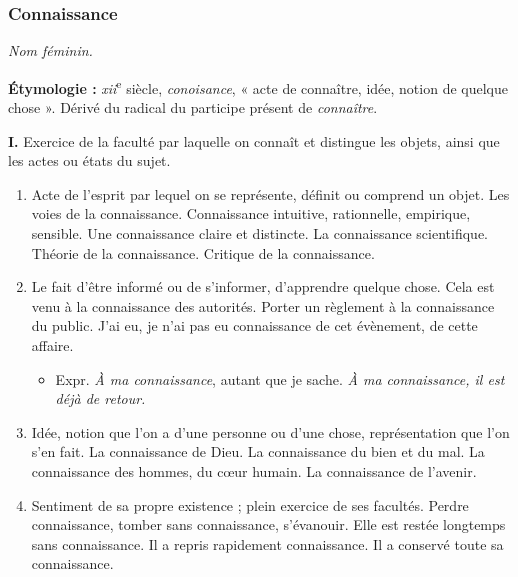 \begin{graybox}
    \subsubsection{Connaissance}

    \textit{Nom féminin.} \parencite{acfr_connaissance}

    \textbf{Étymologie :} \textit{xii}\textsuperscript{e} siècle,
    \textit{conoisance}, « acte de connaître, idée, notion de quelque chose ».
    Dérivé du radical du participe présent de \textit{connaître}.

    \textbf{I.} Exercice de la faculté par laquelle on connaît et distingue
    les objets, ainsi que les actes ou états du sujet.

    \begin{enumerate}
        \item Acte de l'esprit par lequel on se représente, définit ou
        comprend un objet. Les voies de la connaissance. Connaissance
        intuitive, rationnelle, empirique, sensible. Une connaissance claire et
        distincte. La connaissance scientifique. Théorie de la connaissance.
        Critique de la connaissance.

        \item Le fait d'être informé ou de s'informer, d'apprendre quelque
        chose. Cela est venu à la connaissance des autorités. Porter un
        règlement à la connaissance du public. J'ai eu, je n'ai pas eu
        connaissance de cet évènement, de cette affaire.
        \begin{itemize}
            \item Expr. \textit{À ma connaissance}, autant que je sache.
            \textit{À ma connaissance, il est déjà de retour.}
        \end{itemize}

        \item Idée, notion que l'on a d'une personne ou d'une chose,
        représentation que l'on s'en fait. La connaissance de Dieu. La
        connaissance du bien et du mal. La connaissance des hommes, du cœur
        humain. La connaissance de l'avenir.

        \item Sentiment de sa propre existence ; plein exercice de ses
        facultés. Perdre connaissance, tomber sans connaissance, s'évanouir.
        Elle est restée longtemps sans connaissance. Il a repris rapidement
        connaissance. Il a conservé toute sa connaissance.


\end{enumerate}
\end{graybox}

